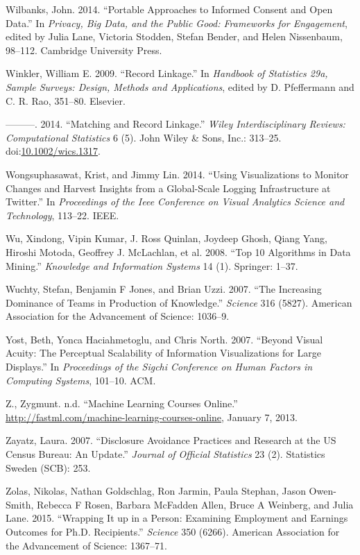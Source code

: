 \documentclass[]{krantz}
\begin{document}
\hypertarget{ref-Wilbanks2014}{}
Wilbanks, John. 2014. ``Portable Approaches to Informed Consent and Open
Data.'' In \emph{Privacy, Big Data, and the Public Good: Frameworks for
Engagement}, edited by Julia Lane, Victoria Stodden, Stefan Bender, and
Helen Nissenbaum, 98--112. Cambridge University Press.

\hypertarget{ref-winkler09}{}
Winkler, William E. 2009. ``Record Linkage.'' In \emph{Handbook of
Statistics 29a, Sample Surveys: Design, Methods and Applications},
edited by D. Pfeffermann and C. R. Rao, 351--80. Elsevier.

\hypertarget{ref-WICS:WICS1317}{}
---------. 2014. ``Matching and Record Linkage.'' \emph{Wiley
Interdisciplinary Reviews: Computational Statistics} 6 (5). John Wiley
\& Sons, Inc.: 313--25.
doi:\href{https://doi.org/10.1002/wics.1317}{10.1002/wics.1317}.

\hypertarget{ref-wongsuphasawat2014using}{}
Wongsuphasawat, Krist, and Jimmy Lin. 2014. ``Using Visualizations to
Monitor Changes and Harvest Insights from a Global-Scale Logging
Infrastructure at Twitter.'' In \emph{Proceedings of the Ieee Conference
on Visual Analytics Science and Technology}, 113--22. IEEE.

\hypertarget{ref-wu2008top}{}
Wu, Xindong, Vipin Kumar, J. Ross Quinlan, Joydeep Ghosh, Qiang Yang,
Hiroshi Motoda, Geoffrey J. McLachlan, et al. 2008. ``Top 10 Algorithms
in Data Mining.'' \emph{Knowledge and Information Systems} 14 (1).
Springer: 1--37.

\hypertarget{ref-wuchty2007increasing}{}
Wuchty, Stefan, Benjamin F Jones, and Brian Uzzi. 2007. ``The Increasing
Dominance of Teams in Production of Knowledge.'' \emph{Science} 316
(5827). American Association for the Advancement of Science: 1036--9.

\hypertarget{ref-yost2007beyond}{}
Yost, Beth, Yonca Haciahmetoglu, and Chris North. 2007. ``Beyond Visual
Acuity: The Perceptual Scalability of Information Visualizations for
Large Displays.'' In \emph{Proceedings of the Sigchi Conference on Human
Factors in Computing Systems}, 101--10. ACM.

\hypertarget{ref-MLcourses}{}
Z., Zygmunt. n.d. ``Machine Learning Courses Online.''
\url{http://fastml.com/machine-learning-courses-online}, January 7,
2013.

\hypertarget{ref-zayatz2007disclosure}{}
Zayatz, Laura. 2007. ``Disclosure Avoidance Practices and Research at
the US Census Bureau: An Update.'' \emph{Journal of Official Statistics}
23 (2). Statistics Sweden (SCB): 253.

\hypertarget{ref-zolas2015wrapping}{}
Zolas, Nikolas, Nathan Goldschlag, Ron Jarmin, Paula Stephan, Jason
Owen-Smith, Rebecca F Rosen, Barbara McFadden Allen, Bruce A Weinberg,
and Julia Lane. 2015. ``Wrapping It up in a Person: Examining Employment
and Earnings Outcomes for Ph.D. Recipients.'' \emph{Science} 350 (6266).
American Association for the Advancement of Science: 1367--71.
\end{document}

